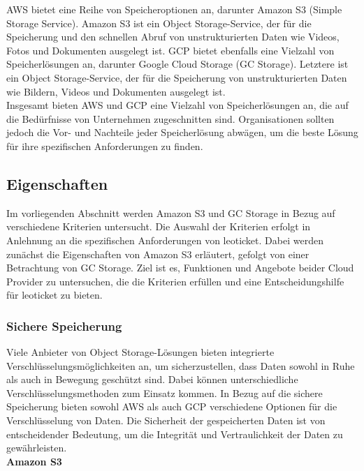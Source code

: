 AWS bietet eine Reihe von Speicheroptionen an, darunter Amazon S3 (Simple Storage Service). Amazon S3 ist ein Object Storage-Service, der für die Speicherung und den schnellen Abruf von unstrukturierten Daten wie Videos, Fotos und Dokumenten ausgelegt ist. GCP bietet ebenfalls eine Vielzahl von Speicherlösungen an, darunter Google Cloud Storage (GC Storage). Letztere ist ein Object Storage-Service, der für die Speicherung von unstrukturierten Daten wie Bildern, Videos und Dokumenten ausgelegt ist.\\
 
Insgesamt bieten AWS und GCP eine Vielzahl von Speicherlösungen an, die auf die Bedürfnisse von Unternehmen zugeschnitten sind. Organisationen sollten jedoch die Vor- und Nachteile jeder Speicherlösung abwägen, um die beste Lösung für ihre spezifischen Anforderungen zu finden.

\subsection{Eigenschaften}

Im vorliegenden Abschnitt werden Amazon S3 und GC Storage in Bezug auf verschiedene Kriterien untersucht. Die Auswahl der Kriterien erfolgt in Anlehnung an die spezifischen Anforderungen von leoticket. Dabei werden zunächst die Eigenschaften von Amazon S3 erläutert, gefolgt von einer Betrachtung von GC Storage. Ziel ist es, Funktionen und Angebote beider Cloud Provider zu untersuchen, die die Kriterien erfüllen und eine Entscheidungshilfe für leoticket zu bieten. 

\newpage

\subsubsection{Sichere Speicherung}

Viele Anbieter von Object Storage-Lösungen bieten integrierte Verschlüsselungsmöglichkeiten an, um sicherzustellen, dass Daten sowohl in Ruhe als auch in Bewegung geschützt sind. Dabei können unterschiedliche Verschlüsselungsmethoden zum Einsatz kommen. In Bezug auf die sichere Speicherung bieten sowohl AWS als auch GCP verschiedene Optionen für die Verschlüsselung von Daten. Die Sicherheit der gespeicherten Daten ist von entscheidender Bedeutung, um die Integrität und Vertraulichkeit der Daten zu gewährleisten.\\

\textbf{Amazon S3}\\

